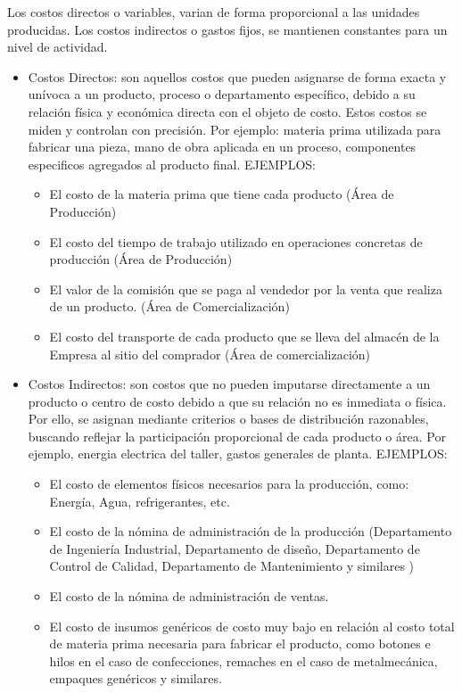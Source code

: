 \documentclass[a4paper,oneside,11pt]{article}
\begin{document}
Los costos directos o variables, varian de forma proporcional a las unidades producidas. Los costos indirectos o gastos fijos, se mantienen constantes para un nivel de actividad.

\begin{itemize}
    \item Costos Directos: son aquellos costos que pueden asignarse de forma exacta y unívoca a un producto, proceso o departamento específico, debido a su relación física y económica directa con el objeto de costo. Estos costos se miden y controlan con precisión. Por ejemplo: materia prima utilizada para fabricar una pieza, mano de obra aplicada en un proceso, componentes especificos agregados al producto final.
    EJEMPLOS:
    \begin{itemize}
        \item El costo de la materia prima que tiene cada producto (Área de Producción)
        \item El costo del tiempo de trabajo utilizado en operaciones concretas de producción (Área de Producción)
        \item El valor de la comisión que se paga al vendedor por la venta que realiza de un producto. (Área de Comercialización)
        \item El costo del transporte de cada producto que se lleva del almacén de la Empresa al sitio del comprador (Área de comercialización)
    \end{itemize}
    \item Costos Indirectos: son costos que no pueden imputarse directamente a un producto o centro de costo debido a que su relación no es inmediata o física. Por ello, se asignan mediante criterios o bases de distribución razonables, buscando reflejar la participación proporcional de cada producto o área. Por ejemplo, energia electrica del taller, gastos generales de planta.
    EJEMPLOS:
        \begin{itemize}
            \item El costo de elementos físicos necesarios para la producción, como: Energía, Agua, refrigerantes, etc.
            \item El costo de la nómina de administración de la producción (Departamento de Ingeniería Industrial, Departamento de diseño, Departamento de Control de Calidad, Departamento de Mantenimiento y similares )
            \item El costo de la nómina de administración de ventas.
            \item El costo de insumos genéricos de costo muy bajo en relación al costo total de materia prima necesaria para fabricar el producto, como botones e hilos en el caso de confecciones, remaches en el caso de metalmecánica, empaques genéricos y similares.
        \end{itemize}
\end{itemize}
\end{document}
